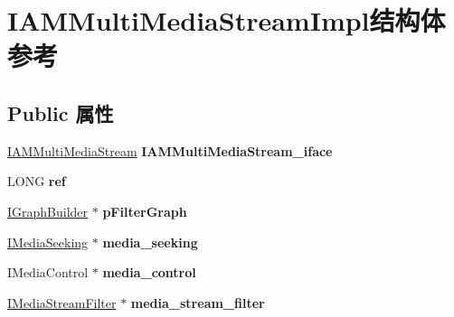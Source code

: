 \hypertarget{struct_i_a_m_multi_media_stream_impl}{}\section{I\+A\+M\+Multi\+Media\+Stream\+Impl结构体 参考}
\label{struct_i_a_m_multi_media_stream_impl}
\subsection*{Public 属性}
\begin{DoxyCompactItemize}
\item 
\mbox{\label{struct_i_a_m_multi_media_stream_impl_a0bea4dddc30952fd3ed899be69c70eb0}} 
\hyperlink{interface_i_a_m_multi_media_stream}{I\+A\+M\+Multi\+Media\+Stream} {\bfseries I\+A\+M\+Multi\+Media\+Stream\+\_\+iface}
\item 
\mbox{\label{struct_i_a_m_multi_media_stream_impl_a146233ce986dae35c5f435f784fb9ed6}} 
L\+O\+NG {\bfseries ref}
\item 
\mbox{\label{struct_i_a_m_multi_media_stream_impl_a03a19445c02ef57ac93edb5227f4d0ba}} 
\hyperlink{interface_i_graph_builder}{I\+Graph\+Builder} $\ast$ {\bfseries p\+Filter\+Graph}
\item 
\mbox{\label{struct_i_a_m_multi_media_stream_impl_a8b644a228fe9f7069fb39919dcbd6038}} 
\hyperlink{interface_i_media_seeking}{I\+Media\+Seeking} $\ast$ {\bfseries media\+\_\+seeking}
\item 
\mbox{\label{struct_i_a_m_multi_media_stream_impl_a9bf95037374b8ece69faa0def290dfce}} 
I\+Media\+Control $\ast$ {\bfseries media\+\_\+control}
\item 
\mbox{\label{struct_i_a_m_multi_media_stream_impl_a3e577bb3da2a9bb9ac0007cda130edf0}} 
\hyperlink{interface_i_media_stream_filter}{I\+Media\+Stream\+Filter} $\ast$ {\bfseries media\+\_\+stream\+\_\+filter}
\item 
\mbox{\label{struct_i_a_m_multi_media_stream_impl_a864405f7d04babac17d65708c9dc5136}} 

\end{DoxyCompactItemize}
